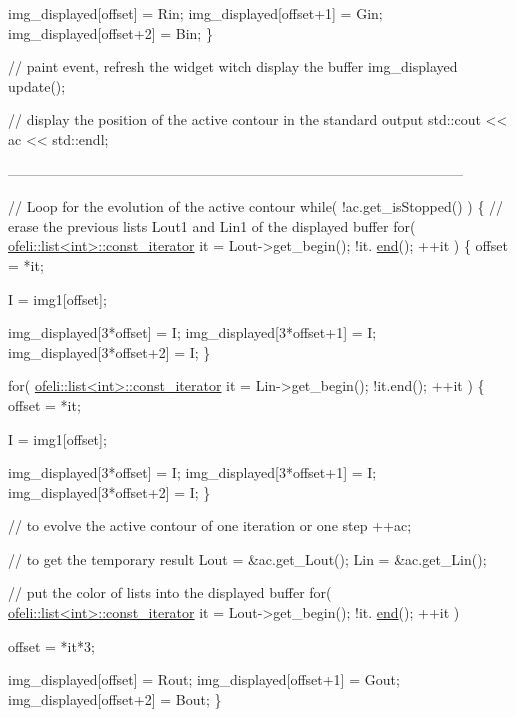 \begin{DoxyCode}
    img\_displayed[offset] = Rin;
    img\_displayed[offset+1] = Gin;
    img\_displayed[offset+2] = Bin;
\}

\textcolor{comment}{// paint event, refresh the widget witch display the buffer img\_displayed}
update();

\textcolor{comment}{// display the position of the active contour in the standard output}
std::cout << ac << std::endl;

--------------------------------------------------------------------------------------------------


\textcolor{comment}{// Loop for the evolution of the active contour}
\textcolor{keywordflow}{while}( !ac.get\_isStopped() )
\{
    \textcolor{comment}{// erase the previous lists Lout1 and Lin1 of the displayed buffer}
    \textcolor{keywordflow}{for}( \hyperlink{classofeli_1_1list_1_1const__iterator}{ofeli::list<int>::const\_iterator} it = Lout->get\_begin(); !it.
      \hyperlink{classofeli_1_1list_1_1const__iterator_aa79779e28253e61c8d1816f577de4ffd}{end}(); ++it )
    \{
        offset = *it;

        I = img1[offset];

        img\_displayed[3*offset] = I;
        img\_displayed[3*offset+1] = I;
        img\_displayed[3*offset+2] = I;
    \}

    \textcolor{keywordflow}{for}( \hyperlink{classofeli_1_1list_1_1const__iterator}{ofeli::list<int>::const\_iterator} it = Lin->get\_begin(); !it.end();
       ++it )
    \{
        offset = *it;

        I = img1[offset];

        img\_displayed[3*offset] = I;
        img\_displayed[3*offset+1] = I;
        img\_displayed[3*offset+2] = I;
    \}

    \textcolor{comment}{// to evolve the active contour of one iteration or one step}
    ++ac;

    \textcolor{comment}{// to get the temporary result}
    Lout = &ac.get\_Lout();
    Lin = &ac.get\_Lin();

    \textcolor{comment}{// put the color of lists into the displayed buffer}
    \textcolor{keywordflow}{for}( \hyperlink{classofeli_1_1list_1_1const__iterator}{ofeli::list<int>::const\_iterator} it = Lout->get\_begin(); !it.
      \hyperlink{classofeli_1_1list_1_1const__iterator_aa79779e28253e61c8d1816f577de4ffd}{end}(); ++it )

        offset = *it*3;

        img\_displayed[offset] = Rout;
        img\_displayed[offset+1] = Gout;
        img\_displayed[offset+2] = Bout;
    \}


\end{DoxyCode}
